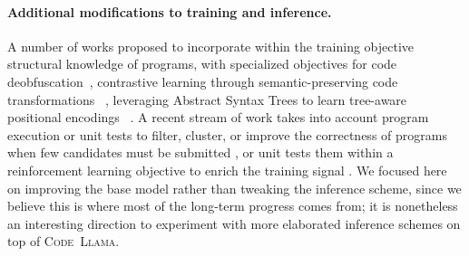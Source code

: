 \documentclass[10pt]{article}
\newcommand{\model}{\textsc{Code~Llama}\xspace}
\begin{document}
\paragraph{Additional modifications to \LLM training and inference.} A number of works proposed to incorporate within the training objective structural knowledge of programs, with specialized objectives for code deobfuscation~\citep{roziere2021dobf}, contrastive learning through semantic-preserving code transformations ~\citep{jain-etal-2021-contrastive}, leveraging Abstract Syntax Trees to learn tree-aware positional encodings ~\citep{NEURIPS2019_6e091746,peng2021integrating}. A recent stream of work takes into account program execution or unit tests to filter, cluster, or improve the correctness of programs when few candidates must be submitted \citep{li2022alphacode,chen2022codet,le2022coderl,zhang2023planning}, or unit tests them within a reinforcement learning objective to enrich the training signal \citep{le2022coderl,liu2023rltf}. We focused here on improving the base model rather than tweaking the inference scheme, since we believe this is where most of the long-term progress comes from; it is nonetheless an interesting direction to experiment with more elaborated inference schemes on top of \model.
\end{document}
